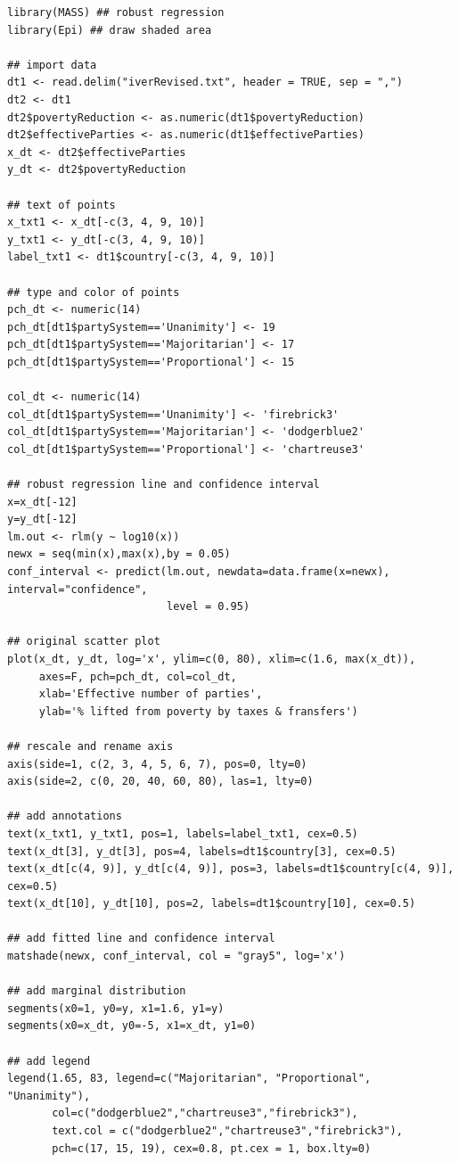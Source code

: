 \documentclass[11pt,letterpaper]{article}
\begin{document}
\begin{verbatim}
library(MASS) ## robust regression
library(Epi) ## draw shaded area

## import data 
dt1 <- read.delim("iverRevised.txt", header = TRUE, sep = ",")
dt2 <- dt1
dt2$povertyReduction <- as.numeric(dt1$povertyReduction)
dt2$effectiveParties <- as.numeric(dt1$effectiveParties)
x_dt <- dt2$effectiveParties
y_dt <- dt2$povertyReduction

## text of points
x_txt1 <- x_dt[-c(3, 4, 9, 10)]
y_txt1 <- y_dt[-c(3, 4, 9, 10)]
label_txt1 <- dt1$country[-c(3, 4, 9, 10)]

## type and color of points
pch_dt <- numeric(14)
pch_dt[dt1$partySystem=='Unanimity'] <- 19
pch_dt[dt1$partySystem=='Majoritarian'] <- 17
pch_dt[dt1$partySystem=='Proportional'] <- 15

col_dt <- numeric(14)
col_dt[dt1$partySystem=='Unanimity'] <- 'firebrick3'
col_dt[dt1$partySystem=='Majoritarian'] <- 'dodgerblue2'
col_dt[dt1$partySystem=='Proportional'] <- 'chartreuse3'

## robust regression line and confidence interval
x=x_dt[-12]
y=y_dt[-12]
lm.out <- rlm(y ~ log10(x))
newx = seq(min(x),max(x),by = 0.05)
conf_interval <- predict(lm.out, newdata=data.frame(x=newx), interval="confidence",
                         level = 0.95)

## original scatter plot
plot(x_dt, y_dt, log='x', ylim=c(0, 80), xlim=c(1.6, max(x_dt)), 
     axes=F, pch=pch_dt, col=col_dt,
     xlab='Effective number of parties',
     ylab='% lifted from poverty by taxes & fransfers')

## rescale and rename axis
axis(side=1, c(2, 3, 4, 5, 6, 7), pos=0, lty=0)
axis(side=2, c(0, 20, 40, 60, 80), las=1, lty=0)

## add annotations
text(x_txt1, y_txt1, pos=1, labels=label_txt1, cex=0.5)
text(x_dt[3], y_dt[3], pos=4, labels=dt1$country[3], cex=0.5)
text(x_dt[c(4, 9)], y_dt[c(4, 9)], pos=3, labels=dt1$country[c(4, 9)], cex=0.5)
text(x_dt[10], y_dt[10], pos=2, labels=dt1$country[10], cex=0.5)

## add fitted line and confidence interval
matshade(newx, conf_interval, col = "gray5", log='x')

## add marginal distribution
segments(x0=1, y0=y, x1=1.6, y1=y)
segments(x0=x_dt, y0=-5, x1=x_dt, y1=0)

## add legend
legend(1.65, 83, legend=c("Majoritarian", "Proportional", "Unanimity"), 
       col=c("dodgerblue2","chartreuse3","firebrick3"), 
       text.col = c("dodgerblue2","chartreuse3","firebrick3"),
       pch=c(17, 15, 19), cex=0.8, pt.cex = 1, box.lty=0)
\end{verbatim}
\end{document}
